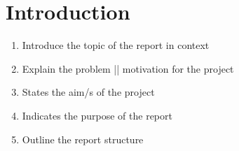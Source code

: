 \section{Introduction}
\begin{enumerate}
    \item Introduce the topic of the report in context
    \item Explain the problem || motivation for the project
    \item States the aim/s of the project
    \item Indicates the purpose of the report
    \item Outline the report structure
\end{enumerate}
\cite{IEEEtran, IEEEtranformatexample}